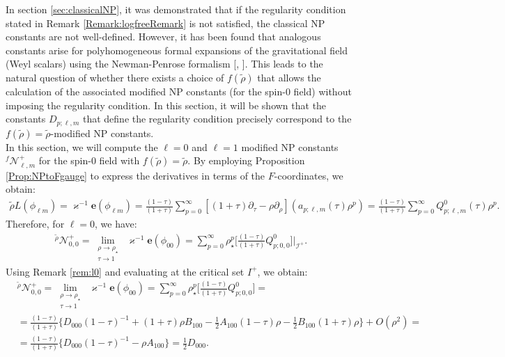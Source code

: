 In section \ref{sec:classicalNP}, it was demonstrated that if the regularity condition stated in Remark \ref{Remark:logfreeRemark} is not satisfied, the classical NP constants are not well-defined. However, it has been found that analogous constants arise for polyhomogeneous formal expansions of the gravitational field (Weyl scalars) using the Newman-Penrose formalism [\cite{Val98}, \cite{Val99a}]. This leads to the natural question of whether there exists a choice of $f(\tilde{\rho})$ that allows the calculation of the associated modified NP constants (for the spin-0 field) without imposing the regularity condition. In this section, it will be shown that the constants $D_{p;\ell,m}$ that define the regularity condition precisely correspond to the $f(\tilde{\rho}) = \tilde{\rho}$-modified NP constants. \\
In this section, we will compute the $\ell=0$ and $\ell=1$ modified NP constants ${}^{f}\mathcal{N}^{+}_{\ell,m}$ for the spin-0 field with $f(\tilde{\rho})=\tilde{\rho}$. By employing Proposition \ref{Prop:NPtoFgauge} to express the derivatives in terms of the $F$-coordinates, we obtain:
\begin{align}
  \tilde{\rho}L (\phi_{\ell m})= \varkappa^{-1}\boldsymbol{e} (\phi_{\ell m}) = \frac{(1-\tau)}{(1+\tau)}\sum_{p=0}^{\infty}[(1+\tau)\partial_{\tau}-\rho\partial_{\rho}](a_{p;\ell,m}(\tau)\rho^p) = \frac{(1-\tau)}{(1+\tau)}\sum_{p=0}^{\infty}Q^{0}_{p;\ell,m}(\tau)\rho^p.
\end{align}
Therefore, for $\ell=0$, we have:
\begin{align}
  \mathcal{}^{\tilde{\rho}}\mathcal{N}^{+}_{0,0} = \lim_{\substack{\rho \to \rho_{\star} \\ \tau \to 1}} \; \varkappa^{-1}\boldsymbol{e}(\phi_{00}) = \sum_{p=0}^{\infty}\rho_{\star}^p\biggl[\frac{(1-\tau)}{(1+\tau)}Q^{0}_{p;0,0}\biggr]|_{\mathscr{I}^{+}}.
\end{align}
Using Remark \ref{rem:l0} and evaluating at the critical set $I^{+}$, we obtain:
\begin{align}
  & \mathcal{}^{\tilde{\rho}}\mathcal{N}^{+}_{0,0} = \lim_{\substack{\rho \to \rho_{\star} \\ \tau \to 1}} \; \varkappa^{-1}\boldsymbol{e}(\phi_{00}) = \sum_{p=0}^{\infty}\rho_{\star}^p\biggl[\frac{(1-\tau)}{(1+\tau)}Q^{0}_{p;0,0}\biggr] = \nonumber \\
  & = \frac{(1-\tau)}{(1+\tau)}\biggl\{D_{000}(1-\tau)^{-1} + (1+\tau)\rho B_{100}-\frac{1}{2}A_{100}(1-\tau)\rho - \frac{1}{2}B_{100}(1+\tau)\rho\biggr\} + O(\rho^{2}) =\nonumber \\
  & = \frac{(1-\tau)}{(1+\tau)}\biggl\{D_{000}(1-\tau)^{-1} - \rho A_{100}\biggr\} = \frac{1}{2}D_{000}.
\end{align}
